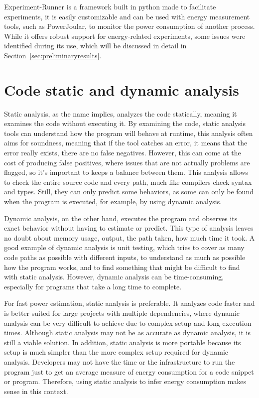 Experiment-Runner\cite{S2_Group_Experiment_Runner} is a framework built in python made to facilitate experiments, it is easily customizable and can be used with energy measurement tools, such as PowerJoular, to monitor the power consumption of another process. While it offers robust support for energy-related experiments, some issues were identified during its use, which will be discussed in detail in Section~\ref{sec:preliminaryresults}.


\section{Code static and dynamic analysis} \label{sec:background_static_dynamic_analysis}

Static analysis, as the name implies, analyzes the code statically, meaning it examines the code without executing it. By examining the code, static analysis tools can understand how the program will behave at runtime\cite{ernst2003static}, this analysis often aims for soundness, meaning that if the tool catches an error, it means that the error really exists, there are no false negatives. However, this can come at the cost of producing false positives, where issues that are not actually problems are flagged, so it's important to keeps a balance between them. This analysis allows to check the entire source code and every path, much like compilers check syntax and types. Still, they can only predict some behaviors, as some can only be found when the program is executed, for example, by using dynamic analysis.

Dynamic analysis, on the other hand, executes the program and observes its exact behavior without having to estimate or predict. This type of analysis leaves no doubt about memory usage, output, the path taken, how much time it took\cite{ernst2003static}. A good example of dynamic analysis is unit testing, which tries to cover as many code paths as possible with different inputs, to understand as much as possible how the program works, and to find something that might be difficult to find with static analysis. However, dynamic analysis can be time-consuming, especially for programs that take a long time to complete.

For fast power estimation, static analysis is preferable. It analyzes code faster and is better suited for large projects with multiple dependencies, where dynamic analysis can be very difficult to achieve due to complex setup and long execution times. Although static analysis may not be as accurate as dynamic analysis, it is still a viable solution. In addition, static analysis is more portable because its setup is much simpler than the more complex setup required for dynamic analysis.
Developers may not have the time or the infrastructure to run the program just to get an average measure of energy consumption for a code snippet or program. Therefore, using static analysis to infer energy consumption makes sense in this context.

